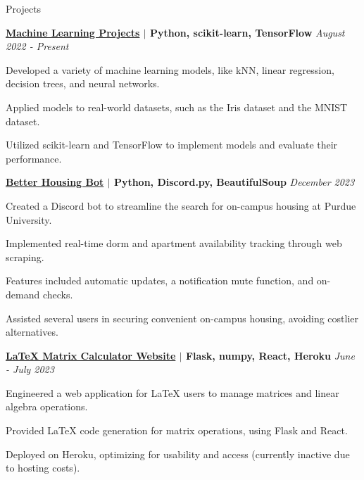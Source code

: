 \documentclass[
    11pt, %
]{resume} %
\begin{document}
\vspace*{-0.4cm}
\begin{rSection}{Projects}

    \begin{rSubsection}{}{}{\bf \href{}{Machine Learning Projects} $\mid$ Python, scikit-learn, TensorFlow }{\hfill \em August 2022 - Present}
        \item Developed a variety of machine learning models, like kNN, linear regression, decision trees, and neural networks.
        \item Applied models to real-world datasets, such as the Iris dataset and the MNIST dataset.
        \item Utilized scikit-learn and TensorFlow to implement models and evaluate their performance.
    \end{rSubsection}


    \begin{rSubsection}{}{}{\bf \href{https://github.com/maxinimus/better-housing-bot}{Better Housing Bot} $\mid$ Python, Discord.py, BeautifulSoup }{\hfill \em December 2023}
        \item Created a Discord bot to streamline the search for on-campus housing at Purdue University.
        \item Implemented real-time dorm and apartment availability tracking through web scraping.
        \item Features included automatic updates, a notification mute function, and on-demand checks.
        \item Assisted several users in securing convenient on-campus housing, avoiding costlier alternatives.
    \end{rSubsection}

    \begin{rSubsection}{}{}{\bf \href{https://github.com/maxinimus/LaTeX-Matrix-Calculator}{LaTeX Matrix Calculator Website} $\mid$ Flask, numpy, React, Heroku }{ \hfill \em June - July 2023}
        \item Engineered a web application for LaTeX users to manage matrices and linear algebra operations.
        \item Provided LaTeX code generation for matrix operations, using Flask and React.
        \item Deployed on Heroku, optimizing for usability and access (currently inactive due to hosting costs).
    \end{rSubsection}

\end{rSection}
\end{document}

